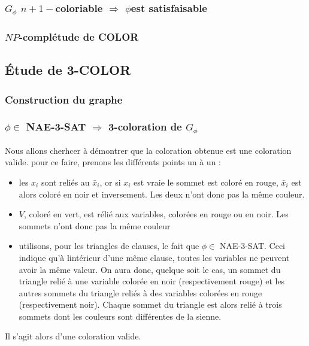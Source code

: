 \subsubsection{$G_\phi$ $n+1-$coloriable $\Rightarrow$ $\phi$est satisfaisable}

\subsubsection{$NP$-complétude de COLOR}

\subsection{Étude de 3-COLOR}

\subsubsection{Construction du graphe}



\subsubsection{$\phi \in$ NAE-3-SAT $ \Rightarrow $ 3-coloration de $G_\phi$}

Nous allons cherhcer à démontrer que la coloration obtenue est une coloration valide. pour ce faire,
prenons les différents points un à un :
\begin{itemize}
	\item les $x_i$ sont reliés au $\bar x_i$, or si $x_i$ est vraie le sommet est coloré en rouge,
		$\bar x_i$ est alors coloré en noir et inversement. Les deux n'ont donc pas la même couleur.
	\item $V$, coloré en vert, est rélié aux variables, colorées en rouge ou en noir. Les sommets
		n'ont donc pas la même couleur
	\item utilisons, pour les triangles de clauses, le fait que $\phi \in$ NAE-3-SAT. Ceci indique
		qu'à lintérieur d'une même clause, toutes les variables ne peuvent avoir la même valeur. On aura
		donc, quelque soit le cas, un sommet du triangle relié à une variable colorée en noir
		(respectivement rouge) et les autres sommets du triangle reliés à des variables colorées en
		rouge (respectivement noir). Chaque sommet du triangle est alors relié à trois sommets dont les
		couleurs sont différentes de la sienne.
\end{itemize}

Il s'agit alors d'une coloration valide.

